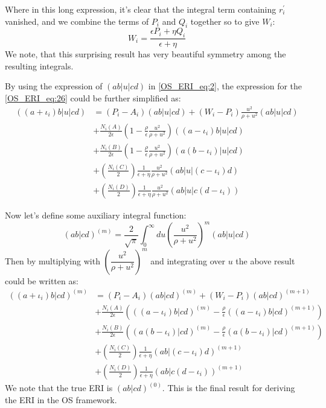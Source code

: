 Where in this long expression, it's clear that the integral term containing
$r^{'}_{i}$ vanished, and we combine the terms of $P_{i}$ and $Q_{i}$ together
so to give $W_{i}$:
\begin{equation}
 W_{i} = \frac{\epsilon P_{i} + \eta Q_{i}}{\epsilon + \eta}
\end{equation}
We note, that this surprising result has very beautiful symmetry among the 
resulting integrals.

By using the expression of $(ab|u|cd)$ in \ref{OS_ERI_eq:2}, the expression for
the \ref{OS_ERI_eq:26} could be further simplified as:
\begin{equation}
 \begin{split}
((a+\iota_{i})b|u|cd) &= (P_{i} - A_{i})(ab|u|cd) +
\left(W_{i} -P_{i}\right)
\frac{u^{2}}{\rho+u^{2}}(ab|u|cd) \\
&+\frac{N_{i}(A)}{2\epsilon}\left(1-\frac{\rho}{\epsilon}
\frac{u^{2}}{\rho+u^{2}}\right)
((a-\iota_{i})b|u|cd) \\
&+\frac{N_{i}(B)}{2\epsilon}\left(1-\frac{\rho}{\epsilon}
\frac{u^{2}}{\rho+u^{2}}\right)
(a(b-\iota_{i})|u|cd) \\
&+\left(\frac{N_{i}(C)}{2}\right)\frac{1}{\epsilon+\eta}\frac{u^{2}}
{\rho+u^{2}}(ab|u|(c-\iota_{i})d) \\
&+\left(\frac{N_{i}(D)}{2}\right)\frac{1}{\epsilon+\eta}\frac{u^{2}}
{\rho+u^{2}}(ab|u|c(d-\iota_{i}))
\end{split}
\label{OS_ERI_eq:27}
\end{equation}

Now let's define some auxiliary integral function:
\begin{equation}
\label{OS_ERI_eq:28}
 (ab|cd)^{(m)} = \frac{2}{\sqrt{\pi}}\int^{\infty}_{0} du \left( \frac{u^{2}}
{\rho+u^{2}}\right)^{m}(ab|u|cd) 
\end{equation}
Then by multiplying with $\left( \dfrac{u^{2}}
{\rho+u^{2}}\right)^{m}$ and integrating over $u$
the above result could be written as:
\begin{equation}
 \begin{split}
((a+\iota_{i})b|cd)^{(m)} &= (P_{i} - A_{i})(ab|cd)^{(m)} +
\left(W_{i} -P_{i}\right)(ab|cd)^{(m+1)} \\
&+\frac{N_{i}(A)}{2\epsilon}\left(((a-\iota_{i})b|cd)^{(m)}-\frac{\rho}{
\epsilon }((a-\iota_{i})b|cd)^{(m+1)}\right)  \\
&+\frac{N_{i}(B)}{2\epsilon}\left((a(b-\iota_{i})|cd)^{(m)}-\frac{\rho}{
\epsilon }(a(b-\iota_{i})|cd)^{(m+1)}\right)  \\
&+\left(\frac{N_{i}(C)}{2}\right)\frac{1}{\epsilon+\eta}
(ab|(c-\iota_{i})d)^{(m+1)} \\
&+\left(\frac{N_{i}(D)}{2}\right)\frac{1}{\epsilon+\eta}
(ab|c(d-\iota_{i}))^{(m+1)}
\end{split}
\label{OS_ERI_result}
\end{equation}
We note that the true ERI is $(ab|cd)^{(0)}$. This is the final result 
for deriving the ERI in the OS framework.

